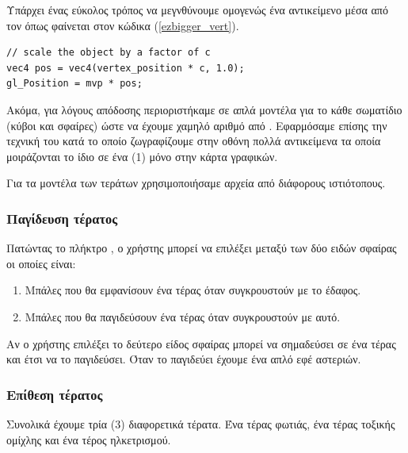 \documentclass[11pt]{scrartcl} %
\begin{document}
Υπάρχει ένας εύκολος τρόπος να μεγνθύνουμε ομογενώς ένα αντικείμενο μέσα από τον  όπως φαίνεται 
στον κώδικα (\ref{ezbigger_vert}).

\begin{minipage}{\textwidth}
\begin{lstlisting}[caption=\textgreek{Μεγέθυνση αντικειμένου από τον} vertex shader, label=ezbigger_vert]
// scale the object by a factor of c
vec4 pos = vec4(vertex_position * c, 1.0);
gl_Position = mvp * pos;
\end{lstlisting}
\end{minipage}
Ακόμα, για λόγους απόδοσης περιοριστήκαμε σε απλά μοντέλα για το κάθε σωματίδιο (κύβοι και σφαίρες) 
ώστε να έχουμε χαμηλό αριθμό από . Εφαρμόσαμε επίσης την τεχνική του 
κατά το οποίο ζωγραφίζουμε στην οθόνη πολλά αντικείμενα τα οποία μοιράζονται το ίδιο 
σε ένα (1) μόνο   στην κάρτα γραφικών.

 
Για τα μοντέλα των τεράτων χρησιμοποιήσαμε αρχεία  από διάφορους ιστιότοπους. 


\subsubsection{Παγίδευση τέρατος}

Πατώντας το πλήκτρο , ο χρήστης μπορεί να επιλέξει μεταξύ των δύο ειδών 
σφαίρας οι οποίες είναι:
\begin{enumerate}
    \item Μπάλες που θα εμφανίσουν ένα τέρας όταν συγκρουστούν με το έδαφος.
    \item Μπάλες που θα παγιδεύσουν ένα τέρας όταν συγκρουστούν με αυτό.
\end{enumerate}

Αν ο χρήστης επιλέξει το δεύτερο είδος σφαίρας μπορεί να σημαδεύσει σε ένα τέρας και 
έτσι να το παγιδεύσει. Όταν το παγιδεύει έχουμε ένα απλό εφέ αστεριών. 


\subsubsection{Επίθεση τέρατος}

Συνολικά έχουμε τρία (3) διαφορετικά τέρατα. Ένα τέρας φωτιάς, ένα τέρας τοξικής ομίχλης και ένα τέρος ηλκετρισμού.
\end{document}
